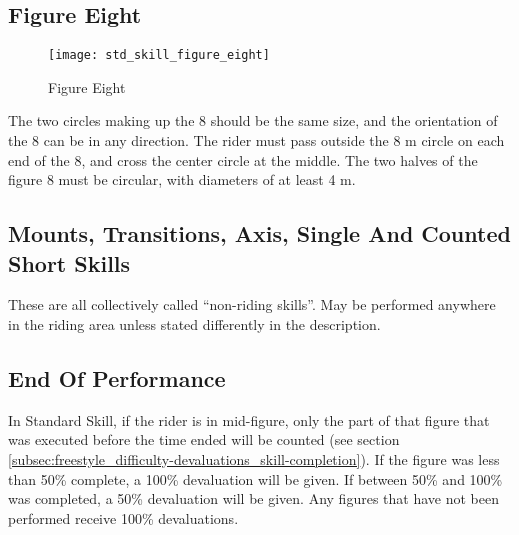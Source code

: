 \subsection{Figure Eight}
\begin{wrapfigure}{r}{0.35\textwidth}
\vspace{-45pt}
\begin{center}
\texttt{[image: std\_skill\_figure\_eight]}
\end{center}
\vspace{-20pt}
\caption{Figure Eight\label{fig:std_skill_figure_eight}}
\vspace{-10pt}
\end{wrapfigure}
The two circles making up the 8 should be the same size, and the orientation of the 8 can be in any direction.
The rider must pass outside the 8 m circle on each end of the 8, and cross the center circle at the middle.
The two halves of the figure 8 must be circular, with diameters of at least 4 m.

\subsection{Mounts, Transitions, Axis, Single And Counted Short Skills}

These are all collectively called ``non-riding skills''.
May be performed anywhere in the riding area unless stated differently in the description.

\subsection{End Of Performance}
In Standard Skill, if the rider is in mid-figure, only the part of that figure that was executed before the time ended will be counted (see section \ref{subsec:freestyle_difficulty-devaluations_skill-completion}).
If the figure was less than 50\% complete, a 100\% devaluation will be given.
If between 50\% and 100\% was completed, a 50\% devaluation will be given.
Any figures that have not been performed receive 100\% devaluations.

